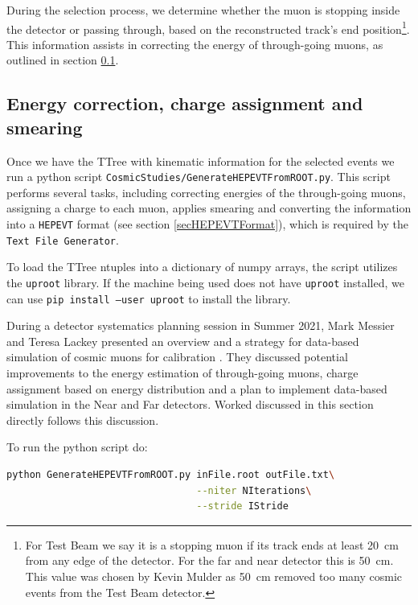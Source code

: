 \documentclass[12pt]{article}
\begin{document}
During the selection process, we determine whether the muon is stopping inside the detector or passing through, based on the reconstructed track's end position\footnote{For Test Beam we say it is a stopping muon if its track ends at least 20~cm from any edge of the detector. For the far and near detector this is 50~cm. This value was chosen by Kevin Mulder \cite{NOVA-doc-39244-v1} as 50~cm removed too many cosmic events from the Test Beam detector.}. This information assists in correcting the energy of through-going muons, as outlined in section \ref{secPython}.

\FloatBarrier
\subsection{Energy correction, charge assignment and smearing}\label{secPython}
Once we have the TTree with kinematic information for the selected events we run a python script \texttt{CosmicStudies/GenerateHEPEVTFromROOT.py}. This script performs several tasks, including correcting energies of the through-going muons, assigning a charge to each muon, applies smearing and converting the information into a \texttt{HEPEVT} format (see section \ref{secHEPEVTFormat}), which is required by the \texttt{Text File Generator}.

To load the TTree ntuples into a dictionary of numpy arrays, the script utilizes the \texttt{uproot} library. If the machine being used does not have \texttt{uproot} installed, we can use \texttt{pip install --user uproot} to install the library.

During a detector systematics planning session in Summer 2021, Mark Messier and Teresa Lackey presented an overview and a strategy for data-based simulation of cosmic muons for calibration \cite{NOVA-doc-51327-v3}. They discussed potential improvements to the energy estimation of through-going muons, charge assignment based on energy distribution and a plan to implement data-based simulation in the Near and Far detectors. Worked discussed in this section directly follows this discussion.

To run the python script do:
\begin{lstlisting}[frame=single,language=bash]
python GenerateHEPEVTFromROOT.py inFile.root outFile.txt\
                                 --niter NIterations\
                                 --stride IStride
\end{lstlisting}
\end{document}
